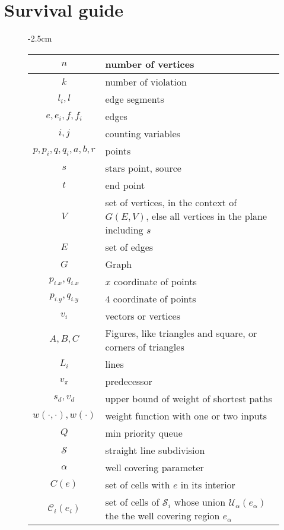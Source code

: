 \chapter{Survival guide}

\begin{figure}
\begin{center}
    \addtolength{\leftskip} {-2.5cm} %
    \addtolength{\rightskip}{-2.5cm}
\begin{tabular}{| c | l |}
	\hline
	$n$ & number of vertices \\
	\hline
	$k$ & number of violation \\
	\hline
	$l_i,l$ & edge segments \\
	\hline
	$e,e_i,f,f_i$ & edges \\
	\hline
	$i,j$ & counting variables \\
	\hline
	$p,p_i,q,q_i,a,b,r$ & points \\
	\hline
	$s$ & stars point, source \\
	\hline
	$t$ & end point \\
	\hline
	$V$ & set of vertices, in the context of $G(E,V)$, else all vertices in the plane including $s$\\
	\hline
	$E$ & set of edges \\
	\hline
	$G$ & Graph \\
	\hline
	$p_{i.x}, q_{i.x}$ & $x$ coordinate of points \\
	\hline
	$p_{i.y}, q_{i.y}$ & $4$ coordinate of points\\
	\hline
	$v_i$ & vectors or vertices \\
	\hline
	$A,B,C$ & Figures, like triangles and square, or corners of triangles \\
	\hline
	$L_i$ & lines \\
	\hline
	$v_{\pi}$ & predecessor \\
	\hline
	$s_d, v_d$ & upper bound of weight of shortest paths \\
	\hline
	$w(\cdot, \cdot), w(\cdot)$ & weight function with one or two inputs \\
	\hline
	$Q$ & min priority queue \\
	\hline
	$\mathcal{S}$ & straight line subdivision \\
	\hline
	$\alpha$ & well covering parameter \\
	\hline
	$C(e)$ & set of cells with $e$ in its interior \\
	$\mathcal{C}_i(e_i)$ & set of cells of $\mathcal{S}_i$ whose union $\mathcal{U}_{\alpha}(e_\alpha)$ the the well covering region $e_{\alpha}$ \\ 

\end{tabular}
\end{center}
\end{figure}
